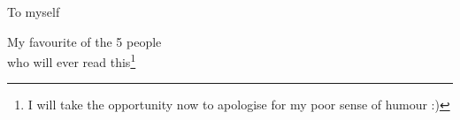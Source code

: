 \cleardoublepage
\thispagestyle{empty}
{}

\vspace*{3cm}

\begin{center}
    To myself
\end{center}

\medskip

\begin{center}
    My favourite of the 5 people\\who will ever read this\footnote{I will take the opportunity now to apologise for my poor sense of humour :)}
\end{center}